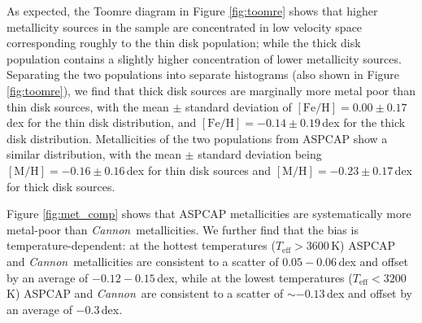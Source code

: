 \documentclass[twocolumn]{aastex62}
\newcommand{\cannon}{\textsl{Cannon}}
\newcommand{\teff}{T_{\mathrm{eff}}}
\newcommand{\feh}{[{\mathrm{Fe}/\mathrm{H}}]}
\newcommand{\mh}{[{\mathrm{M}/\mathrm{H}}]}
\begin{document}
As expected, the Toomre diagram in Figure \ref{fig:toomre} shows that higher metallicity sources in the sample are concentrated in low velocity space corresponding roughly to the thin disk population; while the thick disk population contains a slightly higher concentration of lower metallicity sources. Separating the two populations into separate histograms (also shown in Figure \ref{fig:toomre}), we find that thick disk sources are marginally more metal poor than thin disk sources, with the mean $\pm$ standard deviation of $\feh=0.00\pm0.17\,$dex for the thin disk distribution, and $\feh=-0.14\pm0.19\,$dex for the thick disk distribution.
Metallicities of the two populations from ASPCAP show a similar distribution, with the mean $\pm$ standard deviation being $\mh=-0.16\pm0.16\,$dex for thin disk sources and $\mh=-0.23\pm0.17\,$dex for thick disk sources.

Figure \ref{fig:met_comp} shows that ASPCAP metallicities are systematically more metal-poor than \cannon\ metallicities. We further find that the bias is temperature-dependent: at the hottest temperatures ($\teff>3600\,$K) ASPCAP and \cannon\ metallicities are consistent to a scatter of $0.05-0.06\,$dex and offset by an average of $-0.12-0.15\,$dex, while at the lowest temperatures ($\teff<3200\,$K) ASPCAP and \cannon\ are consistent to a scatter of $\sim-0.13\,$dex and offset by an average of $-0.3\,$dex.


\end{document}
